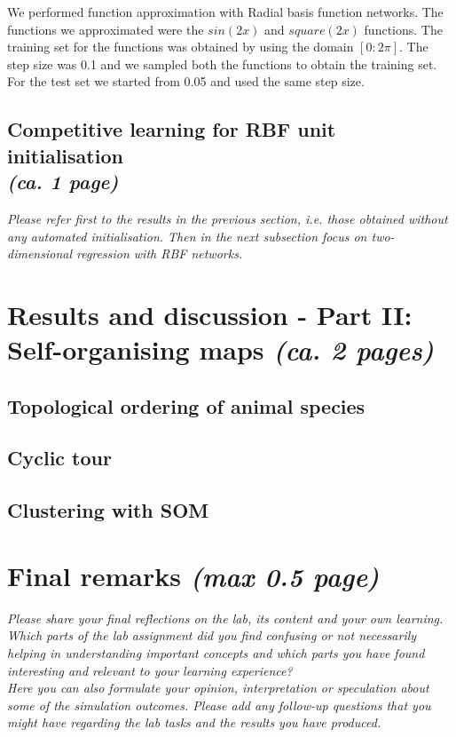 \documentclass[a4paper]{article}
\begin{document}
We performed function approximation with Radial basis function networks. The functions we approximated were the $sin(2x)$ and $square(2x)$ functions. The training set for the functions was obtained by using the domain $[0:2\pi]$. The step size was 0.1 and we sampled both the functions to obtain the training set. For the test set we started from 0.05 and used the same step size.  



\subsection{Competitive learning for RBF unit initialisation\\ \normalsize{\textit{(ca. 1 page)}}}
\textit{Please refer first to the results in the previous section, i.e. those obtained without any automated initialisation. Then in the next subsection focus on two-dimensional regression with RBF networks.}


\section{Results and discussion - Part II: Self-organising maps \normalsize{\textit{(ca. 2 pages)}}}

\subsection{Topological ordering of animal species}

\subsection{Cyclic tour}

\subsection{Clustering with SOM}

\section{Final remarks \normalsize{\textit{(max 0.5 page)}}}
\textit{Please share your final reflections on the lab, its content and your own learning. Which parts of the lab assignment did you find confusing or not necessarily helping in understanding important concepts and which parts you have found interesting and relevant to your learning experience? \\
Here you can also formulate your opinion, interpretation or speculation about some of the simulation outcomes. Please add any follow-up questions that you might have regarding the lab tasks and the results you have produced.}
\end{document}
